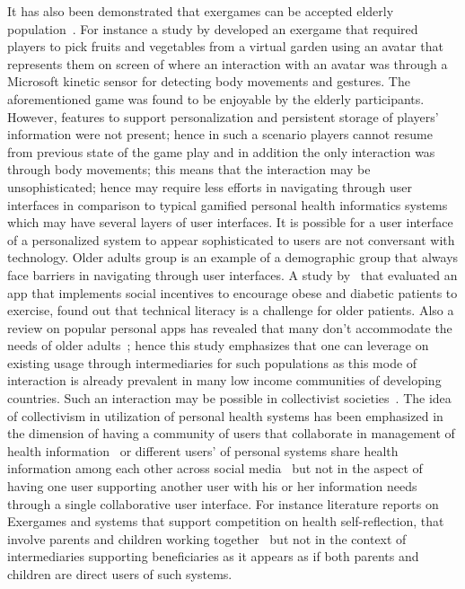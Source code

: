 It has also been demonstrated that exergames can be accepted elderly population~\citep{brox2011exergames}. For instance a study by \cite{brauner2013increase} developed an exergame that required players to pick fruits and vegetables from a virtual garden using an avatar that represents them on screen of where an interaction with an avatar was through a Microsoft kinetic sensor for detecting body movements and gestures. The aforementioned game was found to be enjoyable by the elderly participants. However, features to support personalization and persistent storage of players' information were not present; hence in such a scenario players cannot resume from previous state of the game play and in addition the only interaction was through body movements; this means that the interaction may be unsophisticated; hence may require less efforts in navigating through user interfaces in comparison to typical gamified personal health informatics systems which may have several layers of user interfaces. It is possible for a user interface of a personalized system to appear sophisticated to users are not conversant with technology. Older adults group is an example of a demographic group that always face barriers in navigating through user interfaces. A study by~\cite{chen2016social} that evaluated an app that implements social incentives to encourage obese and diabetic patients to exercise, found out that technical literacy is a challenge for older patients. Also a review on popular personal apps has revealed that many don't accommodate the needs of older adults~\citep{silva2014:smartphones}; hence this study emphasizes that one can leverage on existing usage through intermediaries for such populations as this mode of interaction is already prevalent in many low income communities of developing countries. Such an interaction may be possible in collectivist societies~\citep{parikh2006}. The idea of collectivism in utilization of personal health systems has been emphasized in the dimension of having a community of users that collaborate in management of health information~\citep{colineau2011motivating,grimes2009toward}  or different users' of personal systems share health information among each other across social media~\citep{ploderer2014social} but not in the aspect of having one user supporting another user with his or her information needs through a single collaborative user interface. For instance literature reports on Exergames and systems that support competition on health self-reflection, that involve  parents and children working together~\citep{grimes2009toward,saksono2015spaceship} but not in the context of intermediaries supporting beneficiaries as it appears as if both parents and children are direct users of such systems. 
